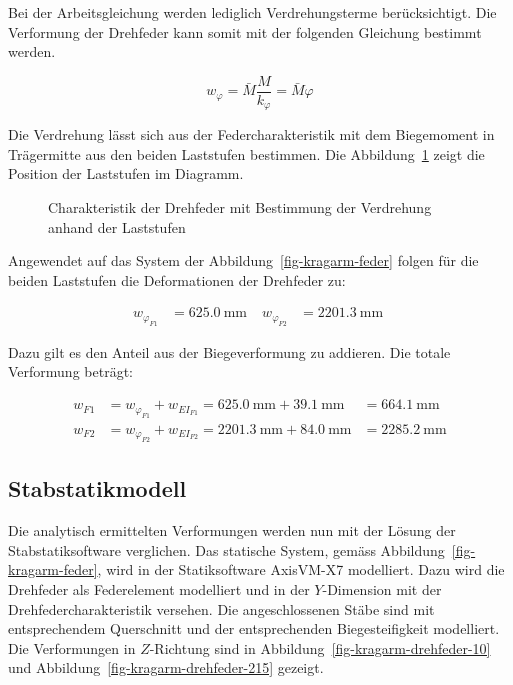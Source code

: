 \documentclass[
  11pt,
  letterpaper,
]{scrreprt}
\begin{document}
Bei der Arbeitsgleichung werden lediglich Verdrehungsterme
berücksichtigt. Die Verformung der Drehfeder kann somit mit der
folgenden Gleichung bestimmt werden.

\[
w_{\varphi} = \bar{M} \frac{M}{k_\varphi} = \bar{M} \varphi
\]

Die Verdrehung lässt sich aus der Federcharakteristik mit dem
Biegemoment in Trägermitte aus den beiden Laststufen bestimmen. Die
Abbildung~\ref{fig-feder-force} zeigt die Position der Laststufen im
Diagramm.

\begin{figure}[H]


\caption{\label{fig-feder-force}Charakteristik der Drehfeder mit
Bestimmung der Verdrehung anhand der Laststufen}

\end{figure}%

Angewendet auf das System der Abbildung~\ref{fig-kragarm-feder} folgen
für die beiden Laststufen die Deformationen der Drehfeder zu:

$$
\begin{aligned}
w_{\varphi_{F1}} &= 625.0\ \mathrm{mm} \; 
 &w_{\varphi_{F2}} &= 2201.3\ \mathrm{mm} \;
\end{aligned}
$$

Dazu gilt es den Anteil aus der Biegeverformung zu addieren. Die totale
Verformung beträgt:

$$
\begin{aligned}
w_{F1} &= w_{\varphi_{F1}} + w_{EI_{F1}}  = 625.0\ \mathrm{mm} + 39.1\ \mathrm{mm} &= 664.1\ \mathrm{mm}  
\\[11pt]
w_{F2} &= w_{\varphi_{F2}} + w_{EI_{F2}}  = 2201.3\ \mathrm{mm} + 84.0\ \mathrm{mm} &= 2285.2\ \mathrm{mm}  
\end{aligned}
$$

\subsection{Stabstatikmodell}\label{stabstatikmodell}

Die analytisch ermittelten Verformungen werden nun mit der Lösung der
Stabstatiksoftware verglichen. Das statische System, gemäss
Abbildung~\ref{fig-kragarm-feder}, wird in der Statiksoftware AxisVM-X7
modelliert. Dazu wird die Drehfeder als Federelement modelliert und in
der \(Y\)-Dimension mit der Drehfedercharakteristik versehen. Die
angeschlossenen Stäbe sind mit entsprechendem Querschnitt und der
entsprechenden Biegesteifigkeit modelliert. Die Verformungen in
\(Z\)-Richtung sind in Abbildung~\ref{fig-kragarm-drehfeder-10} und
Abbildung~\ref{fig-kragarm-drehfeder-215} gezeigt.
\end{document}
